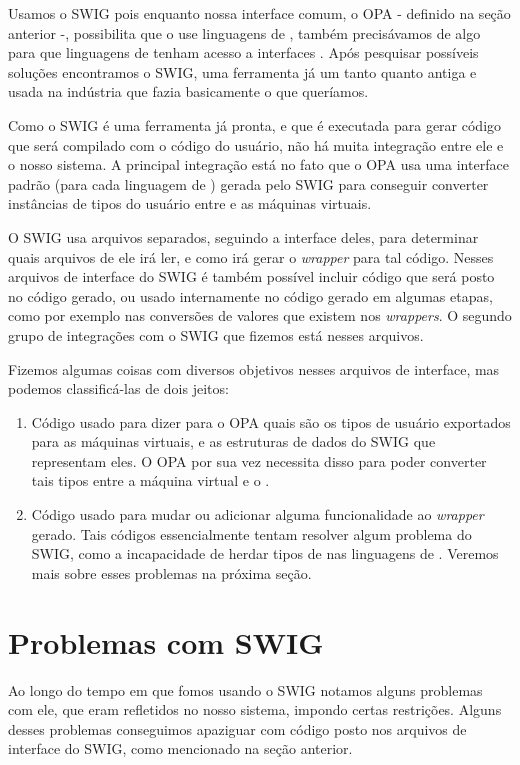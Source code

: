   
  Usamos o SWIG pois enquanto nossa interface comum, o OPA - definido na seção anterior -, 
  possibilita que o \CXX{} use linguagens de \script{}, também precisávamos de algo para que linguagens 
  de \script{} tenham acesso a interfaces \CXX{}. Após pesquisar possíveis soluções encontramos
  o SWIG, uma ferramenta já um tanto quanto antiga e usada na indústria que fazia basicamente o
  que queríamos.
  
  Como o SWIG é uma ferramenta já pronta, e que é executada para gerar código que será compilado
  com o código do usuário, não há muita integração entre ele e o nosso sistema. A principal
  integração está no fato que o OPA usa uma interface padrão (para cada linguagem de \script{})
  gerada pelo SWIG para conseguir converter instâncias de tipos do usuário entre \CXX{} e as
  máquinas virtuais.
  
  O SWIG usa arquivos separados, seguindo a interface deles, para determinar quais arquivos
  de \CXX{} ele irá ler, e como irá gerar o \textit{wrapper} para tal código. Nesses arquivos
  de interface do SWIG é também possível incluir código que será posto no código gerado, ou usado
  internamente no código gerado em algumas etapas, como por exemplo nas conversões de valores
  que existem nos \textit{wrappers}. O segundo grupo de integrações com o SWIG que fizemos está
  nesses arquivos.
  
  Fizemos algumas coisas com diversos objetivos nesses arquivos de interface, mas podemos
  classificá-las de dois jeitos:
  \begin{enumerate}
    \item Código usado para dizer para o OPA quais são os tipos de usuário exportados para
      as máquinas virtuais, e as estruturas de dados do SWIG que representam eles. O OPA
      por sua vez necessita disso para poder converter tais tipos entre a máquina virtual
      e o \CXX{}.
    \item Código usado para mudar ou adicionar alguma funcionalidade ao \textit{wrapper}
      gerado. Tais códigos essencialmente tentam resolver algum problema do SWIG, como
      a incapacidade de herdar tipos de \CXX{} nas linguagens de \script{}. Veremos mais
      sobre esses problemas na próxima seção.
  \end{enumerate}
  
  
  \section{Problemas com SWIG}
  Ao longo do tempo em que fomos usando o SWIG notamos alguns problemas com ele, que eram
  refletidos no nosso sistema, impondo certas restrições. Alguns desses problemas conseguimos
  apaziguar com código posto nos arquivos de interface do SWIG, como mencionado na seção
  anterior.
  
